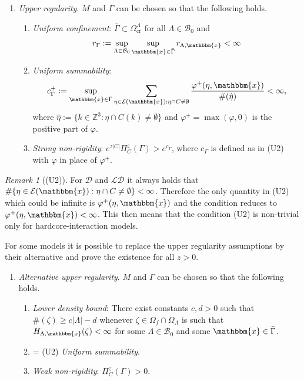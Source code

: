 \documentclass[12pt,a4paper]{article}
\theoremstyle{definition}
\theoremstyle{remark}
\newtheorem{remark}{Remark}
\theoremstyle{theorem}
\newcommand{\x}{\mathbbm{x}}
\begin{document}
\begin{enumerate}[\textbf{(U)}] 
	\item \textit{Upper regularity}. $M$ and $\Gamma$ can be chosen so that the following holds. 
		\begin{enumerate}[(U1)]
			\item \textit{Uniform confinement}: $\bar \Gamma \subset \Omega^\Lambda_\text{cr}$ for all $\Lambda \in \mathcal B_0$ and 
			$$r_\Gamma := \sup_{\Lambda\in\mathcal B_0}\sup_{\x \in \bar\Gamma} r_{\Lambda, \x} < \infty$$
			\item \textit{Uniform summability}: 
			$$c^+_\Gamma := \sup_{\x \in \bar\Gamma}  \sum_{\eta \in \mathcal E(\x): \eta \cap C \neq \emptyset} \frac{\varphi^+(\eta,\x)}{\#(\hat\eta)} < \infty,$$
where $\hat\eta := \{k \in \mathbb Z^3: \eta \cap C(k) \neq \emptyset\}$ and $\varphi^+ = \max(\varphi,0)$ is the positive part of $\varphi$.
\item \textit{Strong non-rigidity}: $e^{z|C|} \Pi^z_C(\Gamma) > e^{c_\Gamma}$, where $c_\Gamma$ is defined as in (U2) with $\varphi$ in place of $\varphi^+$.
		\end{enumerate}
\end{enumerate}

\begin{remark}[(U2)]\label{r:U2}
	For $\mathcal D$ and $\mathcal {LD}$ it always holds that $\#\{\eta \in \mathcal E(\x): \eta \cap C \neq \emptyset\}<\infty$. Therefore the only quantity in (U2) which could be infinite is $\varphi^+(\eta,\x)$ and the condition reduces to $\varphi^+(\eta,\x) <  \infty$. This then means that the condition (U2) is non-trivial only for hardcore-interaction models.
\end{remark}



For some models it is possible to replace the upper regularity assumptions by their alternative and prove the existence for all $z>0$.

\begin{enumerate}[(\textbf{\^{U}})]
	\item \textit{Alternative upper regularity}. $M$ and $\Gamma$ can be chosen so that the following holds.
	\begin{enumerate}[(\^U1)]
		\item \textit{Lower density bound}: There exist constants $c,d > 0$ such that $\#(\zeta) \geq c|\Lambda| - d$ whenever $\zeta \in \Omega_f\cap \Omega_\Lambda$ is such that $H_{\Lambda,\x}(\zeta)<\infty$ for some $\Lambda \in \mathcal B_0$ and some $\x \in \bar\Gamma$.
		\item = (U2) \textit{Uniform summability}.
		\item \textit{Weak non-rigidity}: $\Pi^z_C(\Gamma) > 0$.
	\end{enumerate}
\end{enumerate}
\end{document}
